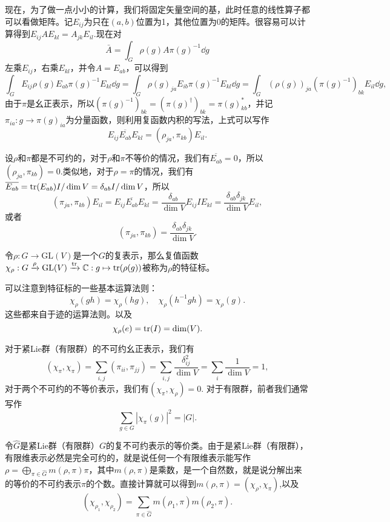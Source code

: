 \documentclass[9pt]{extarticle}
\newcommand{\cc}{\mathbb{C}}
\begin{document}
\para 现在，为了做一点小小的计算，我们将固定矢量空间的基，此时任意的线性算子都可以看做矩阵。记$E_{ij}$为只在$(a,b)$位置为1，其他位置为0的矩阵。很容易可以计算得到$E_{ij}AE_{kl}=A_{jk}E_{il}$.现在对
\[
	\bar{A}=\int_G \rho(g)A\pi(g)^{-1}\dd g
\]
左乘$E_{ij}$，右乘$E_{kl}$，并令$A=E_{ab}$，可以得到
\[
	\int_G E_{ij}\rho(g)E_{ab}\pi(g)^{-1}E_{kl}\dd g=\int_G \rho(g)_{ja}E_{ib}\pi(g)^{-1}E_{kl}\dd g=\int_G (\rho(g))_{ja}\left(\pi(g)^{-1}\right)_{bk}E_{il}\dd g,
\]
由于$\pi$是幺正表示，所以$\left(\pi(g)^{-1}\right)_{bk}=\left(\pi(g)^{\dag}\right)_{bk}=\pi(g)_{kb}^*$，并记$\pi_{ia}:g\to \pi(g)_{ia}$为分量函数，则利用复函数内积的写法，上式可以写作
\[
	E_{ij}\overline{E_{ab}}E_{kl}=\left(\rho_{ja},\pi_{kb}\right)E_{il}.
\]

\para 设$\rho$和$\pi$都是不可约的，对于$\rho$和$\pi$不等价的情况，我们有$\overline{E_{ab}}=0$，所以$\left(\rho_{ja},\pi_{kb}\right)=0$.类似地，对于$\rho=\pi$的情况，我们有$\overline{E_{ab}}=\operatorname{tr}(E_{ab})I/\dim V=\delta_{ab}I/\dim V$，所以
\[
	\left(\pi_{ja},\pi_{kb}\right)E_{il}=E_{ij}\overline{E_{ab}}E_{kl}=\frac{\delta_{ab}}{\dim V}E_{ij}IE_{kl}=\frac{\delta_{ab}\delta_{jk}}{\dim V}E_{il},
\]
或者
\[
	\left(\pi_{ja},\pi_{kb}\right)=\frac{\delta_{ab}\delta_{jk}}{\dim V}.
\]

\para 令$\rho:G\to \mathrm{GL}(V)$是一个$G$的复表示，那么复值函数$\chi_\rho:G\xrightarrow{\rho}\mathrm{GL}(V)\xrightarrow{\tr}\cc:g\mapsto \tr(\rho(g))$被称为$\rho$的特征标。

可以注意到特征标的一些基本运算法则：
\[
	\chi_\rho(gh)=\chi_\rho(hg),\quad \chi_\rho(h^{-1}gh)= \chi_\rho(g).
\]
这些都来自于迹的运算法则。以及
\[
	\chi_\rho(e)=\operatorname{tr}(I)=\dim(V).
\]

\para 对于紧Lie群（有限群）的不可约幺正表示，我们有
\[
(\chi_\pi, \chi_\pi)=\sum_{i,j}(\pi_{ii},\pi_{jj})=\sum_{i,j}\frac{\delta_{ij}^2}{\dim V}=\sum_{i}\frac{1}{\dim V}=1,
\]
对于两个不可约的不等价表示，我们有$(\chi_\pi, \chi_\rho)=0$. 对于有限群，前者我们通常写作
\[
	\sum_{g\in G} |\chi_\pi(g)|^2=|G|.
\]

令$\hat{G}$是紧Lie群（有限群）$G$的复不可约表示的等价类。由于是紧Lie群（有限群），有限维表示必然是完全可约的，就是说任何一个有限维表示能写作$\rho=\bigoplus_{\pi\in\hat{G}}m(\rho,\pi)\pi$，其中$m(\rho,\pi)$是乘数，是一个自然数，就是说分解出来的等价的不可约表示$\pi$的个数。直接计算就可以得到$m(\rho,\pi)=(\chi_\rho,\chi_\pi)$,以及
\begin{equation}
	(\chi_{\rho_1},\chi_{\rho_2})=\sum_{\pi\in\hat{G}}m(\rho_1,\pi)m(\rho_2,\pi).
\end{equation}
\end{document}
